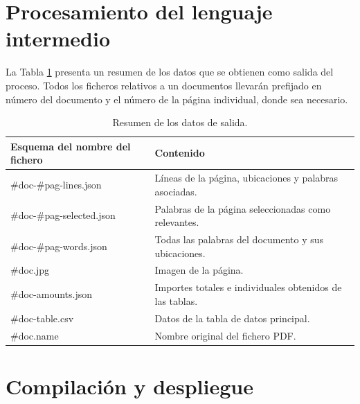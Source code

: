 \section{Procesamiento del lenguaje intermedio}

La Tabla \ref{tab:datos-de-salida} presenta un resumen de los datos que se obtienen como salida del proceso. Todos los ficheros relativos a un documentos llevarán prefijado en número del documento y el número de la página individual, donde sea necesario.

\begin{table}[ht]
    \centering
    \begin{tabular}{l l}
        Esquema del nombre del fichero & Contenido \\
        \hline
        \hline
        \#doc-\#pag-lines.json & Líneas de la página, ubicaciones y palabras asociadas. \\
        \#doc-\#pag-selected.json & Palabras de la página seleccionadas como relevantes. \\
        \#doc-\#pag-words.json & Todas las palabras del documento y sus ubicaciones. \\
        \#doc.jpg & Imagen de la página. \\
        \#doc-amounts.json & Importes totales e individuales obtenidos de las tablas. \\
        \#doc-table.csv & Datos de la tabla de datos principal. \\
        \#doc.name & Nombre original del fichero PDF.\\
    \end{tabular}
    \caption{Resumen de los datos de salida.}    
    \label{tab:datos-de-salida}
\end{table}

\section{Compilación y despliegue}

